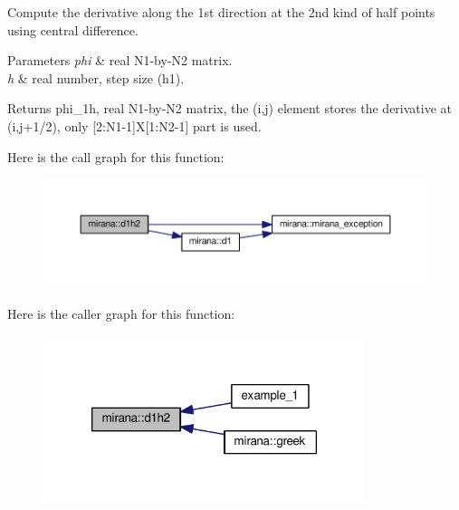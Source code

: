 Compute the derivative along the 1st direction at the 2nd kind of half points using central difference. 


\begin{DoxyParams}{Parameters}
{\em phi} & real N1-\/by-\/\-N2 matrix. \\
\hline
{\em h} & real number, step size (h1). \\
\hline
\end{DoxyParams}
\begin{DoxyReturn}{Returns}
phi\-\_\-1h, real N1-\/by-\/\-N2 matrix, the (i,j) element stores the derivative at (i,j+1/2), only \mbox{[}2\-:N1-\/1\mbox{]}X\mbox{[}1\-:N2-\/1\mbox{]} part is used. 
\end{DoxyReturn}


Here is the call graph for this function\-:\nopagebreak
\begin{figure}[H]
\begin{center}
\leavevmode
\includegraphics[width=350pt]{classmirana_a9d6168761271912ebfea872e9f322cdc_cgraph}
\end{center}
\end{figure}




Here is the caller graph for this function\-:\nopagebreak
\begin{figure}[H]
\begin{center}
\leavevmode
\includegraphics[width=266pt]{classmirana_a9d6168761271912ebfea872e9f322cdc_icgraph}
\end{center}
\end{figure}


